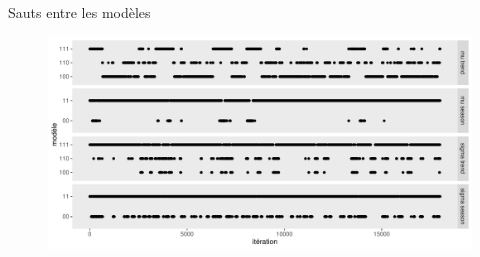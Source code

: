 \documentclass[aspectratio=169]{beamer}
\begin{document}
\begin{frame}{Sauts entre les modèles}
	\begin{figure}
	\vspace{-0.15cm}
	 \includegraphics[width=\textwidth, center]{../figures/jumps.pdf}
	\end{figure}
\end{frame}
\end{document}
